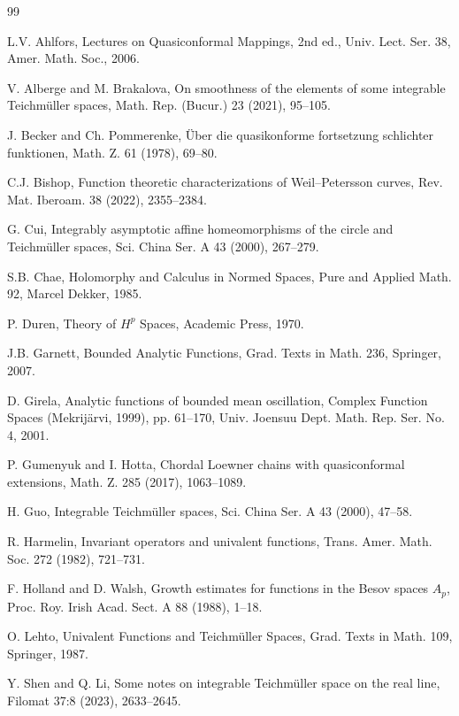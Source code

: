\documentclass[amstex,12pt,reqno]{amsart}
\theoremstyle{definition}
\begin{document}
\begin{thebibliography}{99}

 L.V. Ahlfors, Lectures on Quasiconformal Mappings, 2nd ed., Univ. Lect. Ser. 38, Amer. Math. Soc., 2006.

 V. Alberge and M. Brakalova, On smoothness of the elements of some integrable Teich\-m\"ul\-ler spaces, 
Math. Rep. (Bucur.) 23 (2021), 95--105.

 J. Becker and Ch. Pommerenke,
\"Uber die quasikonforme fortsetzung schlichter funktionen, Math. Z. 61 (1978), 69--80. 

 C.J. Bishop, Function theoretic characterizations of Weil--Petersson curves, 
Rev. Mat. Iberoam. 38 (2022), 2355--2384.

 G. Cui, Integrably asymptotic affine homeomorphisms of the circle and Teich\-m\"ul\-ler spaces, 
Sci. China Ser. A 43 (2000), 267--279.

 S.B. Chae, Holomorphy and Calculus in Normed Spaces, 
Pure and Applied Math. 92, Marcel Dekker, 1985.

 P. Duren, Theory of $H^p$ Spaces, 
Academic Press, 1970.

 J.B. Garnett, Bounded Analytic Functions, 
Grad. Texts in Math. 236, Springer, 2007.

 D. Girela, Analytic functions of bounded mean oscillation, 
Complex Function Spaces (Mekrij\"arvi, 1999), pp. 61--170, Univ. Joensuu Dept. Math. Rep. Ser. No. 4, 2001.

 P. Gumenyuk and I. Hotta, Chordal Loewner chains with quasiconformal extensions, 
Math. Z. 285 (2017), 1063--1089.

 H. Guo, Integrable Teichm\"uller spaces, Sci. China Ser. A 43 (2000), 47--58. 

 R. Harmelin, Invariant operators and univalent functions, 
Trans. Amer. Math. Soc. 272 (1982), 721--731.

 F. Holland and D. Walsh, Growth estimates for functions in the Besov spaces $A_p$, 
Proc. Roy. Irish Acad. Sect. A 88 (1988), 1--18. 

 O. Lehto, 
Univalent Functions and Teich\-m\"ul\-ler Spaces, 
Grad. Texts in Math. 109, Springer, 1987.

 Y. Shen and Q. Li, Some notes on integrable Teich\-m\"ul\-ler space on the real line,
Filomat 37:8 (2023), 2633--2645.


\end{thebibliography}
\end{document}
